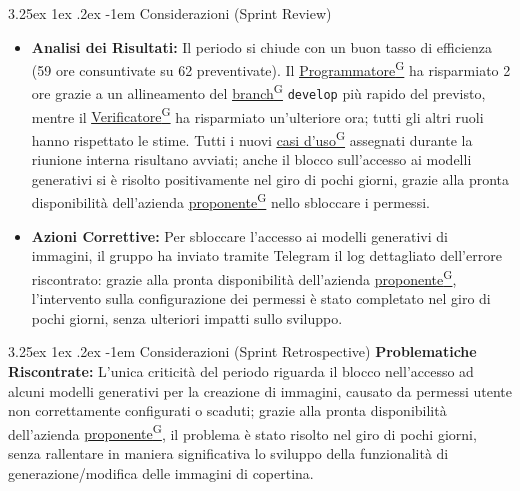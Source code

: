 \documentclass[a4paper,12pt]{article}
\makeatletter
\renewcommand\paragraph{\@startsection{paragraph}{5}{\z@}%
  {3.25ex \@plus1ex \@minus.2ex}%
  {-1em}%
  {\normalfont\normalsize\bfseries}}
\providecommand{\glslink}[2]{\href{https://alittlebyte-19.github.io/Documentazione/glossario.html\#gls-#1}{\underline{#2}\textsuperscript{\scriptsize G}}}
\makeatother
\begin{document}
\paragraph{Considerazioni (Sprint Review)}
\begin{itemize}
    \item \textbf{Analisi dei Risultati:} Il periodo si chiude con un buon tasso di efficienza (59 ore consuntivate su 62 preventivate). Il \glslink{programmatore}{Programmatore} ha risparmiato 2 ore grazie a un allineamento del \glslink{branch}{branch} \texttt{develop} più rapido del previsto, mentre il \glslink{verificatore}{Verificatore} ha risparmiato un'ulteriore ora; tutti gli altri ruoli hanno rispettato le stime. Tutti i nuovi \glslink{caso-d-uso-uc}{casi d'uso} assegnati durante la riunione interna risultano avviati; anche il blocco sull'accesso ai modelli generativi si è risolto positivamente nel giro di pochi giorni, grazie alla pronta disponibilità dell'azienda \glslink{committente-proponente}{proponente} nello sbloccare i permessi.
    \item \textbf{Azioni Correttive:} Per sbloccare l'accesso ai modelli generativi di immagini, il gruppo ha inviato tramite Telegram il log dettagliato dell'errore riscontrato: grazie alla pronta disponibilità dell'azienda \glslink{committente-proponente}{proponente}, l'intervento sulla configurazione dei permessi è stato completato nel giro di pochi giorni, senza ulteriori impatti sullo sviluppo.
\end{itemize}

\paragraph{Considerazioni (Sprint Retrospective)}
\textbf{Problematiche Riscontrate:} L'unica criticità del periodo riguarda il blocco nell'accesso ad alcuni modelli generativi per la creazione di immagini, causato da permessi utente non correttamente configurati o scaduti; grazie alla pronta disponibilità dell'azienda \glslink{committente-proponente}{proponente}, il problema è stato risolto nel giro di pochi giorni, senza rallentare in maniera significativa lo sviluppo della funzionalità di generazione/modifica delle immagini di copertina.
\end{document}
